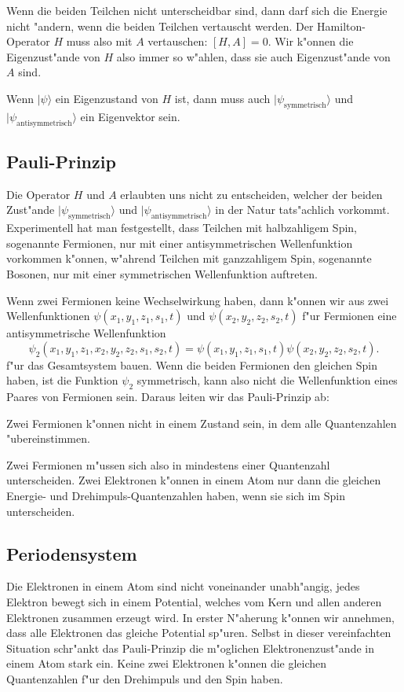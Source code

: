 Wenn die beiden Teilchen nicht unterscheidbar sind, dann darf sich
die Energie nicht "andern, wenn die beiden Teilchen vertauscht
werden. Der Hamilton-Operator $H$ muss also mit $A$ vertauschen:
$[H,A]=0$. Wir k"onnen die Eigenzust"ande von $H$ also immer so
w"ahlen, dass sie auch Eigenzust"ande von $A$ sind.

Wenn $|\psi\rangle$ ein Eigenzustand von $H$ ist, dann muss auch
$|\psi_{\text{symmetrisch}}\rangle$ und
$|\psi_{\text{antisymmetrisch}}\rangle$ ein Eigenvektor sein.

\subsection{Pauli-Prinzip}
Die Operator $H$ und $A$ erlaubten uns nicht zu entscheiden, welcher
der beiden Zust"ande $|\psi_{\text{symmetrisch}}\rangle$ und
$|\psi_{\text{antisymmetrisch}}\rangle$ in der Natur tats"achlich
vorkommt.
Experimentell hat man festgestellt, dass Teilchen mit halbzahligem
Spin, sogenannte Fermionen, nur mit einer antisymmetrischen
Wellenfunktion vorkommen k"onnen, w"ahrend Teilchen mit
ganzzahligem Spin, sogenannte Bosonen, nur mit einer symmetrischen
Wellenfunktion auftreten.

Wenn zwei Fermionen keine Wechselwirkung haben, dann k"onnen wir
aus zwei Wellenfunktionen
$\psi(x_1,y_1,z_1,s_1,t)$
und
$\psi(x_2,y_2,z_2,s_2,t)$
f"ur Fermionen eine antisymmetrische Wellenfunktion
\[
\psi_2(x_1,y_1,z_1,x_2,y_2,z_2,s_1,s_2,t)
=
\psi(x_1,y_1,z_1,s_1,t)
\psi(x_2,y_2,z_2,s_2,t).
\]
f"ur das Gesamtsystem bauen.
Wenn die beiden Fermionen den gleichen Spin haben, ist die
Funktion $\psi_2$ symmetrisch, kann also nicht die Wellenfunktion
eines Paares von Fermionen sein. 
Daraus leiten wir das Pauli-Prinzip ab:

\begin{satz}
Zwei Fermionen k"onnen nicht in einem Zustand sein, in dem alle
Quantenzahlen "ubereinstimmen.
\end{satz}
Zwei Fermionen m"ussen sich also in mindestens einer Quantenzahl
unterscheiden.
Zwei Elektronen k"onnen in einem Atom nur dann die gleichen
Energie- und Drehimpuls-Quantenzahlen haben, wenn sie sich im
Spin unterscheiden.

\subsection{Periodensystem}
Die Elektronen in einem Atom sind nicht voneinander unabh"angig,
jedes Elektron bewegt sich in einem Potential, welches vom Kern
und allen anderen Elektronen zusammen erzeugt wird.
In erster N"aherung k"onnen wir annehmen, dass alle Elektronen
das gleiche Potential sp"uren.
Selbst in dieser vereinfachten Situation schr"ankt das Pauli-Prinzip
die m"oglichen Elektronenzust"ande in einem Atom stark ein.
Keine zwei Elektronen k"onnen die gleichen Quantenzahlen f"ur
den Drehimpuls und den Spin haben.

